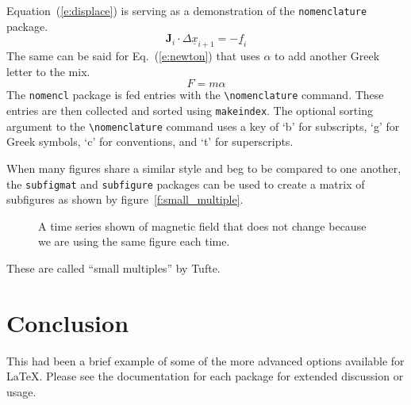 \documentclass[]{aiaa-tc}%
\newcommand{\eqnref}[1]{(\ref{#1})}
\newcommand{\package}[1]{\texttt{#1}}
\begin{document}
Equation~\eqnref{e:displace} is serving as a demonstration of the
\package{nomenclature} package.
\begin{equation}
  \label{e:displace}
  \mathbf{J}_i\cdot\Delta\underline{x}_{i+1}=-\underline{f}_i
\end{equation}%
%
%
%
%
%
The same can be said for Eq.~\eqnref{e:newton} that uses $\alpha$ to add
another Greek letter to the mix.
\begin{equation}
  \label{e:newton}
  F=m\alpha
\end{equation}%
%
%
%
The \package{nomencl} package is fed entries with the
\verb|\nomenclature| command.
These entries are then collected and sorted using \verb|makeindex|.
The optional sorting argument to the \verb|\nomenclature| command uses
a key of `b' for subscripts, `g' for Greek symbols, `c' for conventions,
and `t' for superscripts.

When many figures share a similar style and beg to be compared to one
another, the \package{subfigmat} and \package{subfigure} packages can be
used to create a matrix of subfigures as shown by
figure~\vref{f:small_multiple}.
\begin{figure}
 \begin{subfigmatrix}{4}%
 \end{subfigmatrix}
 \caption{A time series shown of magnetic field that does not change
          because we are using the same figure each time.}
 \label{f:small_multiple}
\end{figure}
These are called ``small multiples'' by Tufte.\cite{tufte:83bk}

\section{Conclusion}

This had been a brief example of some of the more advanced options
available for \LaTeX.
Please see the documentation for each package for extended discussion or
usage.



\end{document}
